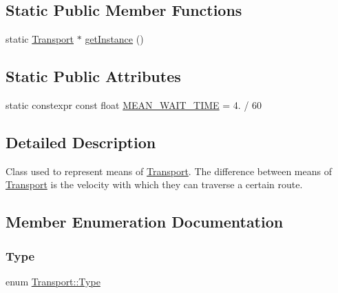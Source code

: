 \subsection*{Static Public Member Functions}
\begin{DoxyCompactItemize}
\item 
static \hyperlink{class_transport}{Transport} $\ast$ \hyperlink{class_transport_a2265878b8225332acf586bece5f1b324}{get\+Instance} ()
\end{DoxyCompactItemize}
\subsection*{Static Public Attributes}
\begin{DoxyCompactItemize}
\item 
static constexpr const float \hyperlink{class_transport_a40222f8cbeb3114a848c091bb9b78c61}{M\+E\+A\+N\+\_\+\+W\+A\+I\+T\+\_\+\+T\+I\+ME} = 4. / 60
\end{DoxyCompactItemize}


\subsection{Detailed Description}
Class used to represent means of \hyperlink{class_transport}{Transport}. The difference between means of \hyperlink{class_transport}{Transport} is the velocity with which they can traverse a certain route. 

\subsection{Member Enumeration Documentation}
\hypertarget{class_transport_a1879cecfed0d4238e5a7af6d085db317}{}\label{class_transport_a1879cecfed0d4238e5a7af6d085db317} 
\subsubsection{\texorpdfstring{Type}{Type}}
{\footnotesize\ttfamily enum \hyperlink{class_transport_a1879cecfed0d4238e5a7af6d085db317}{Transport\+::\+Type}}


